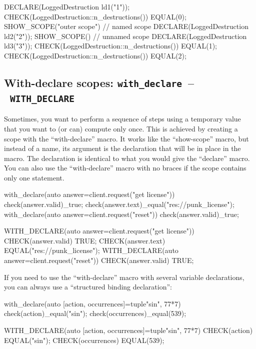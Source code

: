 \documentclass[twoside, a4paper, article]{memoir}
\newcommand*\testudocolor{\color{red!80!blue}}
\newcommand*\testudo[1]{\texttt{\testudocolor{}#1}}
\newcommand*\testudopair[2]{\testudo{#1}~--~\testudo{#2}}
\begin{document}
\begin{cpplisting}
DECLARE(LoggedDestruction ld1("1"));
CHECK(LoggedDestruction::n_destructions()) EQUAL(0);
SHOW_SCOPE("outer scope") // named scope
{
  DECLARE(LoggedDestruction ld2("2"));
  SHOW_SCOPE() // unnamed scope
  {
    DECLARE(LoggedDestruction ld3("3"));
  }
  CHECK(LoggedDestruction::n_destructions()) EQUAL(1);
}
CHECK(LoggedDestruction::n_destructions()) EQUAL(2);
\end{cpplisting}

\subsection{With-declare scopes: \testudopair{with\_declare}{WITH\_DECLARE}}
\label{sec:with-declare-scopes}

Sometimes, you want to perform a sequence of steps using a temporary value that
you want to (or can) compute only once.  This is achieved by creating a scope
with the ``with-declare'' macro.  It works like the ``show-scope'' macro, but
instead of a name, its argument is the declaration that will be in place in the
macro.  The declaration is identical to what you would give the ``declare''
macro.  You can also use the ``with-declare'' macro with no braces if the scope
contains only one statement.

\begin{cpplisting}
with_declare(auto answer=client.request("get license")) {
  check(answer.valid)_true;
  check(answer.text)_equal("res://punk_license");
}
with_declare(auto answer=client.request("reset"))
  check(answer.valid)_true;
\end{cpplisting}

\begin{cpplisting}
WITH_DECLARE(auto answer=client.request("get license"))
{
  CHECK(answer.valid) TRUE;
  CHECK(answer.text) EQUAL("res://punk_license");
}
WITH_DECLARE(auto answer=client.request("reset"))
  CHECK(answer.valid) TRUE;
\end{cpplisting}

If you need to use the ``with-declare'' macro with several variable
declarations, you can always use a ``structured binding declaration'':
\begin{cpplisting}
with_declare(auto [action, occurrences]=tuple{"sin", 77*7}) {
  check(action)_equal("sin");
  check(occurrences)_equal(539);
}
\end{cpplisting}

\begin{cpplisting}
WITH_DECLARE(auto [action, occurrences]=tuple{"sin", 77*7})
{
  CHECK(action) EQUAL("sin");
  CHECK(occurrences) EQUAL(539);
}
\end{cpplisting}
\end{document}
